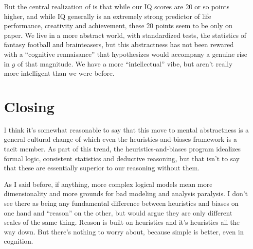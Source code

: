 \documentclass{article}
\begin{document}
But the central realization of \textcite{flynn87} is that while our IQ scores are 20 or so points higher, and while IQ generally is an extremely strong predictor of life performance, creativity and achievement, these 20 points seem to be only on paper.
We live in a more abstract world, with standardized tests, the statistics of fantasy football and brainteasers, but this abstractness has not been rewared with a ``cognitive rennaisance'' that \textcite{flynn07} hypothesizes would accompany a genuine rise in $g$ of that magnitude.
We have a more ``intellectual'' vibe, but aren't really more intelligent than we were before.

\section{Closing}

I think it's somewhat reasonable to say that this move to mental abstractness is a general cultural change of which even the heuristics-and-biases framework is a tacit member.
As part of this trend, the heuristics-and-biases program idealizes formal logic, consistent statistics and deductive reasoning, but that isn't to say that these are essentially superior to our reasoning without them.

As I said before, if anything, more complex logical models mean more dimensionality and more grounds for bad modeling and analysis paralysis.
I don't see there as being any fundamental difference between heuristics and biases on one hand and ``reason'' on the other, but would argue they are only different scales of the same thing.
Reason is built on heuristics and it's heuristics all the way down.
But there's nothing to worry about, because simple is better, even in cognition.


\printbibliography
\end{document}
